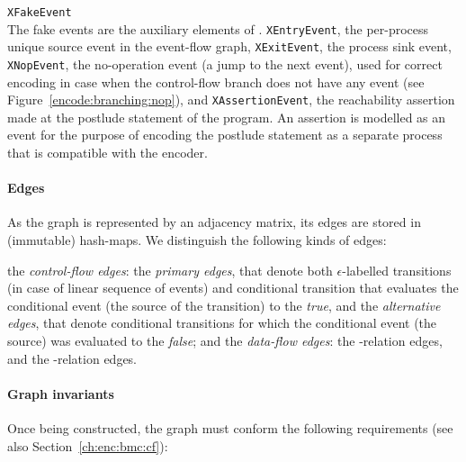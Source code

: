 \begin{outline}
  \1 \texttt{XFakeEvent} \\
    The fake events are the auxiliary elements of \xgraph{}.
    \2 \texttt{XEntryEvent}, the per-process unique source event in the event-flow graph,
    \2 \texttt{XExitEvent}, the process sink event,
    \2 \texttt{XNopEvent}, the no-operation event (a jump to the next event), used for correct encoding in case when the control-flow branch does not have any event (see Figure~\ref{encode:branching:nop}), and
    \2 \texttt{XAssertionEvent}, the reachability assertion made at the postlude statement of the program.
    An assertion is modelled as an event for the purpose of encoding the postlude statement as a separate process that is compatible with the encoder.
\end{outline}



\paragraph{Edges}
\label{ch:impl:model:xgraph:edges}
As the graph is represented by an adjacency matrix, its edges are stored in (immutable) hash-maps.
We distinguish the following kinds of edges:

\begin{outline}%
  \1 the \textit{control-flow edges}:
    \2 the \textit{primary edges}, that denote both $\epsilon$-labelled transitions (in case of linear sequence of events) and conditional transition that evaluates the conditional event (the source of the transition) to the \textit{true}, and
    \2 the \textit{alternative edges}, that denote conditional transitions for which the conditional event (the source) was evaluated to the \textit{false}; and
  \1 the \textit{data-flow edges}:
    \2 the \co{}-relation edges, and 
    \2 the \rf{}-relation edges. %
\end{outline}


\paragraph{Graph invariants}
\label{ch:impl:model:xgraph:invariants}
Once being constructed, the graph must conform the following requirements (see also Section~\ref{ch:enc:bmc:cf}):

